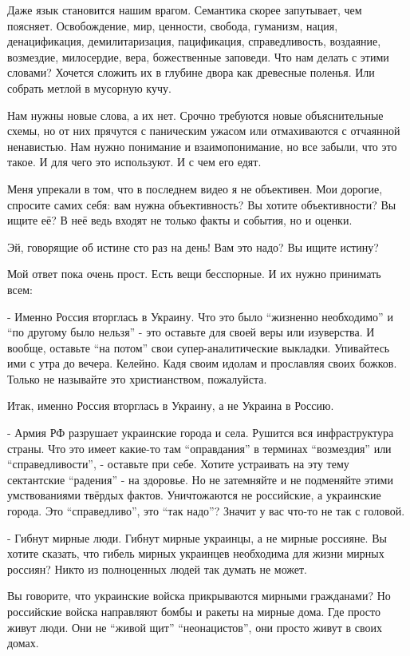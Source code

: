 Даже язык становится нашим врагом. Семантика скорее запутывает, чем поясняет.
Освобождение, мир, ценности, свобода, гуманизм, нация, денацификация,
демилитаризация, пацификация, справедливость, воздаяние, возмездие, милосердие,
вера, божественные заповеди. Что нам делать с этими словами? Хочется сложить их
в глубине двора как древесные поленья. Или собрать метлой в мусорную кучу.

Нам нужны новые слова, а их нет. Срочно требуются новые объяснительные схемы,
но от них прячутся с паническим ужасом или отмахиваются с отчаянной ненавистью.
Нам нужно понимание и взаимопонимание, но все забыли, что это такое. И для чего
это используют. И с чем его едят. 

Меня упрекали в том, что в последнем видео я не объективен. Мои дорогие,
спросите самих себя: вам нужна объективность? Вы хотите объективности? Вы ищите
её? В неё ведь входят не только факты и события, но и оценки.

Эй, говорящие об истине сто раз на день! Вам это надо? Вы ищите истину? 

Мой ответ пока очень прост. Есть вещи бесспорные. И их нужно принимать всем:

- Именно Россия вторглась в Украину. Что это было \enquote{жизненно необходимо} и \enquote{по
другому было нельзя} - это оставьте для своей веры или изуверства. И вообще,
оставьте \enquote{на потом} свои супер-аналитические выкладки. Упивайтесь ими с утра до
вечера. Келейно. Кадя своим идолам и прославляя своих божков. Только не
называйте это христианством, пожалуйста.

Итак, именно Россия вторглась в Украину, а не Украина в Россию. 

- Армия РФ разрушает украинские города и села. Рушится вся инфраструктура
страны. Что это имеет какие-то там \enquote{оправдания} в терминах \enquote{возмездия} или
\enquote{справедливости}, - оставьте при себе. Хотите устраивать на эту тему
сектантские \enquote{радения} - на здоровье. Но не затемняйте и не подменяйте этими
умствованиями твёрдых фактов. Уничтожаются не российские, а украинские города.
Это \enquote{справедливо}, это \enquote{так надо}? Значит у вас что-то не так с головой.

- Гибнут мирные люди. Гибнут мирные украинцы, а не мирные россияне. Вы хотите
сказать, что гибель мирных украинцев необходима для жизни мирных россиян? Никто
из полноценных людей так думать не может.

Вы говорите, что украинские войска прикрываются мирными гражданами? Но
российские войска направляют бомбы и ракеты на мирные дома. Где просто живут
люди. Они не \enquote{живой щит} \enquote{неонацистов}, они просто живут в своих домах.

